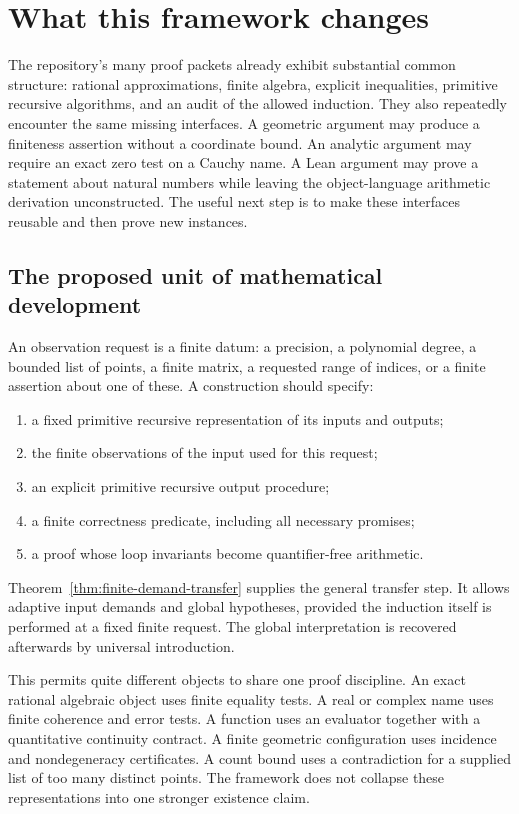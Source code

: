 \section{What this framework changes}

The repository's many proof packets already exhibit substantial common
structure: rational approximations, finite algebra, explicit inequalities,
primitive recursive algorithms, and an audit of the allowed induction.
They also repeatedly encounter the same missing interfaces. A geometric
argument may produce a finiteness assertion without a coordinate bound.
An analytic argument may require an exact zero test on a Cauchy name.
A Lean argument may prove a statement about natural numbers while leaving
the object-language arithmetic derivation unconstructed. The useful next
step is to make these interfaces reusable and then prove new instances.

\subsection{The proposed unit of mathematical development}

An observation request is a finite datum: a precision, a polynomial degree,
a bounded list of points, a finite matrix, a requested range of indices,
or a finite assertion about one of these. A construction should specify:
\begin{enumerate}
\item a fixed primitive recursive representation of its inputs and outputs;
\item the finite observations of the input used for this request;
\item an explicit primitive recursive output procedure;
\item a finite correctness predicate, including all necessary promises;
\item a proof whose loop invariants become quantifier-free arithmetic.
\end{enumerate}
Theorem~\ref{thm:finite-demand-transfer} supplies the general transfer step.
It allows adaptive input demands and global hypotheses, provided the
induction itself is performed at a fixed finite request. The global
interpretation is recovered afterwards by universal introduction.

This permits quite different objects to share one proof discipline. An
exact rational algebraic object uses finite equality tests. A real or
complex name uses finite coherence and error tests. A function uses an
evaluator together with a quantitative continuity contract. A finite
geometric configuration uses incidence and nondegeneracy certificates.
A count bound uses a contradiction for a supplied list of too many
distinct points. The framework does not collapse these representations
into one stronger existence claim.


